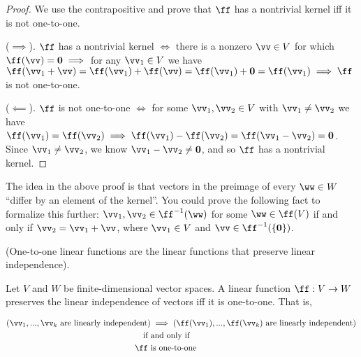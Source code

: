 \begin{proof}
    We use the contrapositive and prove that $\ff$ has a nontrivial kernel iff it is not one-to-one.
    
    ($\implies$). $\ff$ has a nontrivial kernel $\iff$ there is a nonzero $\vv \in V$ for which $\ff(\vv) = \mathbf{0} \implies$ for any $\vv_1 \in V$ we have $\ff(\vv_1 + \vv) = \ff(\vv_1) + \ff(\vv) = \ff(\vv_1) + \mathbf{0} = \ff(\vv_1) \implies \ff$ is not one-to-one.
    
    ($\impliedby$). $\ff$ is not one-to-one $\iff$ for some $\vv_1, \vv_2 \in V$ with $\vv_1 \neq \vv_2$ we have $\ff(\vv_1) = \ff(\vv_2) \implies \ff(\vv_1) - \ff(\vv_2) = \ff(\vv_1 - \vv_2) = \mathbf{0}$. Since $\vv_1 \neq \vv_2$, we know $\vv_1 - \vv_2 \neq \mathbf{0}$, and so $\ff$ has a nontrivial kernel.
\end{proof}

\begin{remark}
    The idea in the above proof is that vectors in the preimage of every $\ww \in W$ ``differ by an element of the kernel''. You could prove the following fact to formalize this further: $\vv_1, \vv_2 \in \ff^{-1}(\ww)$ for some $\ww \in \ff(V)$ if and only if $\vv_2 = \vv_1 + \vv$, where $\vv_1 \in V$ and $\vv \in \ff^{-1}(\{\mathbf{0}\})$.
\end{remark}

\begin{theorem}
\label{ch::lin_alg::thm::one_to_one_linear_fns_are_the_linear_fns_preserving_linear_independence}

    (One-to-one linear functions are the linear functions that preserve linear independence). 
    
    Let $V$ and $W$ be finite-dimensional vector spaces. A linear function $\ff:V \rightarrow W$ preserves the linear independence of vectors iff it is one-to-one. That is, 
    
    \begin{align*}
       (\vv_1, ..., \vv_k \text{ are linearly independent}) &\implies (\ff(\vv_1), ..., \ff(\vv_k) \text{ are linearly independent})\\
        \text{if} \text{ } &\text{and only if} \\
        \ff \text{ } &\text{is one-to-one}
    \end{align*}
\end{theorem}


